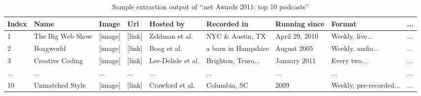 \begin{table*}
\centering
\caption{Sample extraction output of ``.net Awards 2011: top 10 podcasts'' \cite{dotNetAwards}}
\begin{tabular}{|l|l|l|l|l|l|l|l|l|} \hline
Index & Name & Image & Url & Hosted by & Recorded in & Running since & Format & ... \\\hline
1 & The Big Web Show & [image] & [link] & Zeldman et al. & NYC \& Austin, TX & April 29, 2010 & Weekly, live... & ...\\
2 & Boagworld & [image] & [link] & Boag et al. & a barn in Hampshire & August 2005 & Weekly, audio... & ...\\
3 & Creative Coding & [image] & [link] & Lee-Delisle et al. & Brighton, Truro... & January 2011 & Every two... & ...\\
... & ... & ... & ... & ... & ... & ... & ... & ... \\
10 & Unmatched Style & [image] & [link] & Crawford et al. & Columbia, SC & 2009 & Weekly, pre-recorded... & ...\\



\end{tabular}
\end{table*}
